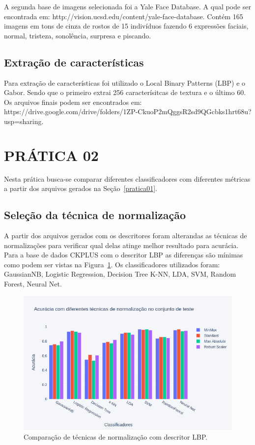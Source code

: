 \documentclass[a4paper, 12 pt, conference]{ieeeconf}  %
\begin{document}
A segunda base de imagens selecionada foi a Yale Face Database. A qual pode ser encontrada em: http://vision.ucsd.edu/content/yale-face-database. Contém 165 imagens em tons de cinza de rostos de 15 indivíduos fazendo 6 expressões faciais, normal, tristeza, sonolência, surpresa e piscando.

\subsection{Extração de características}
Para extração de características foi utilizado o Local Binary Patterns (LBP) e o Gabor. Sendo que o primeiro extrai 256 caracterísitcas de textura e o último 60. Os arquivos finais podem ser encontrados em: https://drive.google.com/drive/folders/1ZP-CkuoP2mQggsR2sd9QGcbks1hrt68u?usp=sharing.

\section{PRÁTICA 02}
\label{pratica02}
Nesta prática busca-se comparar diferentes classificadores com diferentes métricas a partir dos arquivos gerados na Seção~\ref{pratica01}.

\subsection{Seleção da técnica de normalização}
A partir dos arquivos gerados com os descritores foram alterandas as técnicas de normalizações para verificar qual delas atinge melhor resultado para acurácia. Para a base de dados CKPLUS com o descritor LBP as diferenças são mínimas como podem ser vistas na Figura~\ref{fig:bar_norm_all}. Os classificadores utilizados foram: GaussianNB, Logistic Regression, Decision Tree K-NN, LDA, SVM, Random Forest, Neural Net.

\begin{figure}[!htbp]
	\centering
	\includegraphics[width=1.0\linewidth,clip=true,trim=0cm 0cm 0cm 0cm, keepaspectratio=true]{bar_norm_all.png}
	\caption{Comparação de técnicas de normalização com descritor LBP.}
	\label{fig:bar_norm_all}
\end{figure}
\end{document}
